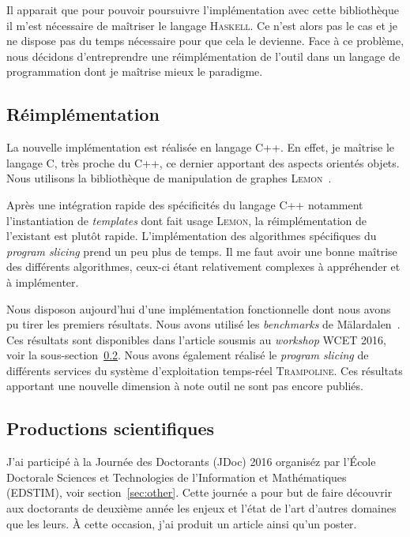     Il apparait que pour pouvoir poursuivre l'implémentation avec cette
    bibliothèque il m'est nécessaire de maîtriser le langage
    \textsc{Haskell}. Ce n'est alors pas le cas et je ne dispose pas du temps
    nécessaire pour que cela le devienne. Face à ce problème, nous décidons
    d'entreprendre une réimplémentation de l'outil dans un langage de
    programmation dont je maîtrise mieux le paradigme.

  \subsection{Réimplémentation}

    La nouvelle implémentation est réalisée en langage \textsc{C++}. En effet,
    je maîtrise le langage \textsc{C}, très proche du \textsc{C++}, ce dernier
    apportant des aspects orientés objets. Nous utilisons la bibliothèque de
    manipulation de graphes \textsc{Lemon}~\cite{DJK11}.

    Après une intégration rapide des spécificités du langage \textsc{C++}
    notamment l'instantiation de \emph{templates} dont fait usage
    \textsc{Lemon}, la réimplémentation de l'existant est plutôt
    rapide. L'implémentation des algorithmes spécifiques du \emph{program
      slicing} prend un peu plus de temps. Il me faut avoir une bonne maîtrise
    des différents algorithmes, ceux-ci étant relativement complexes à
    appréhender et à implémenter.

    \medskip
    
    Nous disposon aujourd'hui d'une implémentation fonctionnelle dont nous avons
    pu tirer les premiers résultats. Nous avons utilisé les \emph{benchmarks} de
    Mälardalen~\cite{GBA10}. Ces résultats sont disponibles dans l'article
    sousmis au \emph{workshop} WCET 2016, voir la
    sous-section~\ref{subsec:sciprod}. Nous avons également réalisé le
    \emph{program slicing} de différents services du système d'exploitation
    temps-réel \textsc{Trampoline}. Ces résultats apportant une nouvelle
    dimension à note outil ne sont pas encore publiés.
      
  \subsection{Productions scientifiques}
    \label{subsec:sciprod}

    J'ai participé à la Journée des Doctorants (JDoc) 2016 organiséz par l'École
    Doctorale Sciences et Technologies de l'Information et Mathématiques
    (EDSTIM), voir section~\ref{sec:other}. Cette journée a pour but de faire
    découvrir aux doctorants de deuxième année les enjeux et l'état de l'art
    d'autres domaines que les leurs. À cette occasion, j'ai produit un article
    ainsi qu'un poster.

